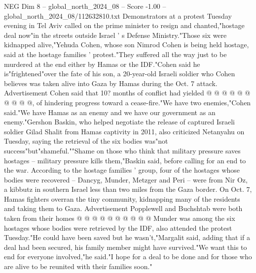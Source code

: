 \begin{textsample}{NEG Dim 8 – global\_north\_2024\_08 – Score -1.00 – global\_north\_2024\_08/112632810.txt}
Demonstrators at a protest Tuesday evening in Tel Aviv called on the prime minister to resign and chanted,"hostage deal now"in the streets outside Israel ' s Defense Ministry."Those six were kidnapped alive,"Yehuda Cohen, whose son Nimrod Cohen is being held hostage, said at the hostage families ' protest."They suffered all the way just to be murdered at the end either by Hamas or the IDF."Cohen said he is"frightened"over the fate of his son, a 20-year-old Israeli soldier who Cohen believes was taken alive into Gaza by Hamas during the Oct. 7 attack.
Advertisement Cohen said that 10? months of conflict had yielded @ @ @ @ @ @ @ @ @ @, of hindering progress toward a cease-fire."We have two enemies,"Cohen said."We have Hamas as an enemy and we have our government as an enemy."Gershon Baskin, who helped negotiate the release of captured Israeli soldier Gilad Shalit from Hamas captivity in 2011, also criticized Netanyahu on Tuesday, saying the retrieval of the six bodies was"not success"but"shameful.""Shame on those who think that military pressure saves hostages -- military pressure kills them,"Baskin said, before calling for an end to the war.
According to the hostage families ' group, four of the hostages whose bodies were recovered -- Dancyg, Munder, Metzger and Peri -- were from Nir Oz, a kibbutz in southern Israel less than two miles from the Gaza border.
On Oct. 7, Hamas fighters overran the tiny community, kidnapping many of the residents and taking them to Gaza.
Advertisement Popplewell and Buchshtab were both taken from their homes @ @ @ @ @ @ @ @ @ @ Munder was among the six hostages whose bodies were retrieved by the IDF, also attended the protest Tuesday."He could have been saved but he wasn't,"Margalit said, adding that if a deal had been secured, his family member might have survived."We want this to end for everyone involved,"he said."I hope for a deal to be done and for those who are alive to be reunited with their families soon."

\end{textsample}
